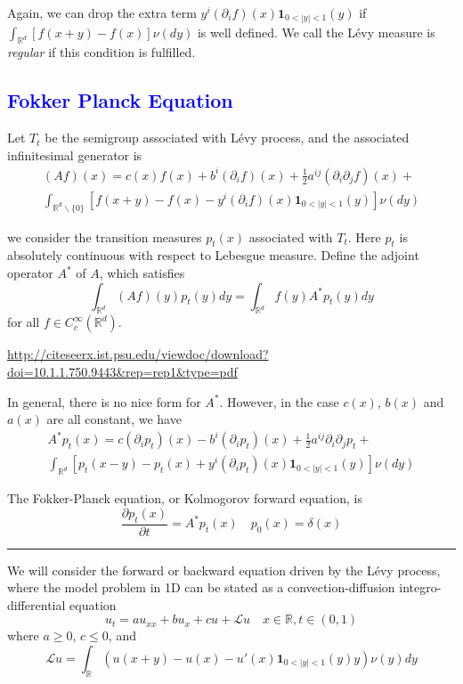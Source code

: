 \documentclass[10pt,a4paper]{article}
\newcommand{\RR}[0]{\mathbb{R}}
\newcommand{\lib}[1]{\subsection*{\textcolor{blue}{#1}}}
\theoremstyle{definition}
\begin{document}
Again, we can drop the extra term $y^i(\partial_i f)(x) \mathbf{1}_{0<|y|<1}(y)$ if $\int_{\RR^d} [f(x+y)-f(x)]\nu(dy)$ is well defined. We call the L\'evy measure is \textit{regular} if this condition is fulfilled.

\lib{Fokker Planck Equation}

Let $T_t$ be the semigroup associated with L\'evy process, and the associated infinitesimal generator is
\begin{multline}\label{equ:Af2}
	(Af)(x) =  c(x) f(x) + b^i(\partial_i f)(x) + \frac{1}{2}a^{ij}(\partial_i \partial_j f)(x) +\\
	\int_{\RR^d\backslash\{0\}} [f(x+y)-f(x)-y^i(\partial_i f)(x) \mathbf{1}_{0<|y|<1}(y)]\nu(dy)
\end{multline}

 we consider the transition measures $p_t(x)$ associated with $T_t$. Here $p_t$ is absolutely continuous with respect to Lebesgue measure. Define the adjoint operator $A^*$ of $A$, which satisfies
 \begin{equation}
 	\int_{\RR^d} (Af)(y) p_t(y)dy=\int_{\RR^d} f(y)A^*p_t(y)dy
 \end{equation}
 for all $f\in C_c^\infty(\RR^d)$.
 
\url{http://citeseerx.ist.psu.edu/viewdoc/download?doi=10.1.1.750.9443&rep=rep1&type=pdf}


 In general, there is no nice form for $A^*$. However, in the case $c(x)$, $b(x)$ and $a(x)$ are all constant, we have
 \begin{multline}
 	A^*p_t(x) = c (\partial_i p_t)(x) - b^i (\partial_i p_t)(x) + \frac{1}{2}a^{ij}\partial_i\partial_j p_t +\\
 	\int_{\RR^d}\left[ p_t( x-y) -p_t(x)+y^i(\partial_i p_t)(x) \mathbf{1}_{0<|y|<1}(y) \right]\nu(dy)
 \end{multline}
 
 The Fokker-Planck equation, or Kolmogorov forward equation, is
 \begin{equation}
 	\frac{\partial p_t(x)}{\partial t} = A^*p_t(x)\quad p_0(x) = \delta(x)
 \end{equation}
 
 \hrule
 
 We will consider the forward or backward equation driven by the L\'evy process, where the model problem in 1D can be stated as a convection-diffusion integro-differential equation
\begin{equation}\label{equ:ut}
	u_t = a u_{xx} + bu_x + cu + \mathcal{L}u\quad x\in \RR, t\in (0,1)
\end{equation}
where $a\geq 0$, $c\leq 0$, and
\begin{equation}
	\mathcal{L}u = \int_\RR (u(x+y)-u(x)-u'(x)\mathbf{1}_{0<|y|<1}(y)y)\nu(y)dy
\end{equation}  
\end{document}
